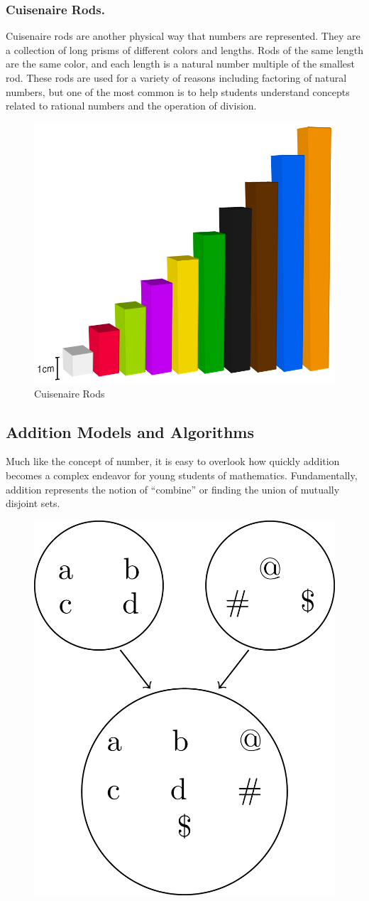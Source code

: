 \documentclass[
]{book}
\theoremstyle{definition}
\theoremstyle{definition}
\theoremstyle{definition}
\theoremstyle{remark}
\begin{document}
\hypertarget{cuisenaire-rods.}{%
\subsubsection*{Cuisenaire Rods.}\label{cuisenaire-rods.}}

Cuisenaire rods are another physical way that numbers are represented. They are a collection of long prisms of different colors and lengths. Rods of the same length are the same color, and each length is a natural number multiple of the smallest rod. These rods are used for a variety of reasons including factoring of natural numbers, but one of the most common is to help students understand concepts related to rational numbers and the operation of division.

\begin{figure}

{\centering \includegraphics[width=0.3\linewidth]{images/Cuisenaire-Rods-2} 

}

\caption{Cuisenaire Rods}\label{fig:unnamed-chunk-68}
\end{figure}

\hypertarget{addition-models-and-algorithms}{%
\subsection{Addition Models and Algorithms}\label{addition-models-and-algorithms}}

Much like the concept of number, it is easy to overlook how quickly addition becomes a complex endeavor for young students of mathematics. Fundamentally, addition represents the notion of ``combine'' or finding the union of mutually disjoint sets.

\begin{figure}

{\centering \includegraphics[width=0.3\linewidth]{tikz/addition-model-set} 

}

\end{figure}
\end{document}
